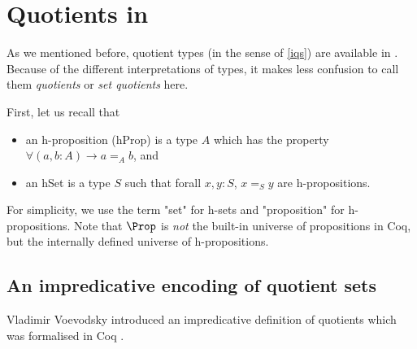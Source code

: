 







\section{Quotients in \hott}\label{qthott}

As we mentioned before, quotient types (in the sense of \ref{iqs}) are available in \hott. Because of the different interpretations of types, it makes less confusion to call them \emph{quotients} or \emph{set quotients} here.

First, let us recall that

\begin{itemize}
\item an h-proposition (hProp) is a type $A$ which has the property $\forall(a, b : A) \to a =_{A} b$, and

\item an hSet is a type $S$ such that forall $x, y : S$, $x =_{S} y$ are h-propositions.
\end{itemize}

For simplicity, we use the term "set" for h-sets and "proposition" for
h-propositions. Note that $\Prop$ is \emph{not} the built-in universe
of propositions in Coq, but the internally defined universe of
h-propositions.

\subsection{An impredicative encoding of quotient sets}\label{impredicative}

Vladimir Voevodsky introduced an impredicative definition of quotients
which was formalised in Coq \cite{voe:hset}.



